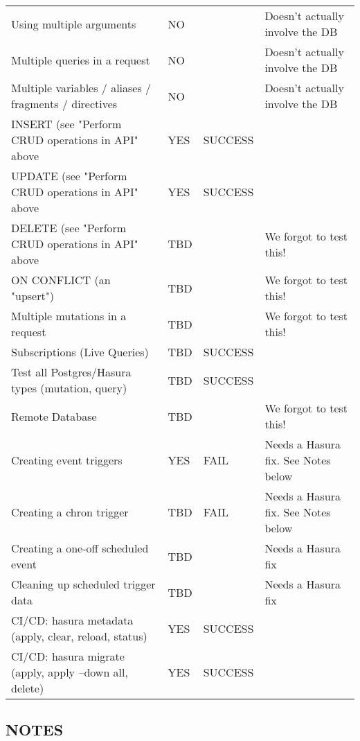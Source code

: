 \documentclass[11pt]{article}
\begin{document}
\begin{center}
\begin{tabular}{llll}
Using multiple arguments & NO &  & Doesn't actually involve the DB\\
Multiple queries in a request & NO &  & Doesn't actually involve the DB\\
Multiple variables / aliases / fragments / directives & NO &  & Doesn't actually involve the DB\\
INSERT (see "Perform CRUD operations in API" above & YES & SUCCESS & \\
UPDATE (see "Perform CRUD operations in API" above & YES & SUCCESS & \\
DELETE (see "Perform CRUD operations in API" above & TBD &  & We forgot to test this!\\
ON CONFLICT (an "upsert") & TBD &  & We forgot to test this!\\
Multiple mutations in a request & TBD &  & We forgot to test this!\\
Subscriptions (Live Queries) & TBD & SUCCESS & \\
Test all Postgres/Hasura types (mutation, query) & TBD & SUCCESS & \\
Remote Database & TBD &  & We forgot to test this!\\
Creating event triggers & YES & FAIL & Needs a Hasura fix. See Notes below\\
Creating a chron trigger & TBD & FAIL & Needs a Hasura fix. See Notes below\\
Creating a one-off scheduled event & TBD &  & Needs a Hasura fix\\
Cleaning up scheduled trigger data & TBD &  & Needs a Hasura fix\\
CI/CD: hasura metadata (apply, clear, reload, status) & YES & SUCCESS & \\
CI/CD: hasura migrate (apply, apply --down all, delete) & YES & SUCCESS & \\
\end{tabular}
\end{center}

\subsection{NOTES}
\label{sec:org8d056ce}
\end{document}
